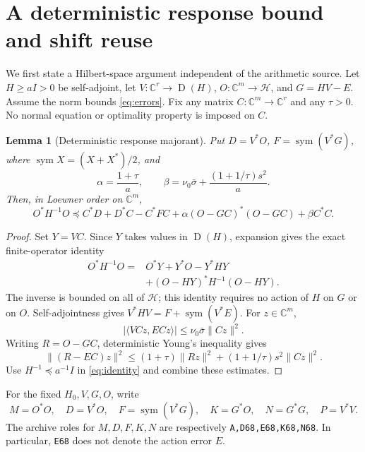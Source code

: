 \documentclass[11pt,a4paper]{article}
\newcommand{\C}{\mathbb C}
\newcommand{\HH}{\mathcal H}
\newcommand{\Id}{I}
\newcommand{\Dom}{\operatorname{D}}
\newcommand{\sym}{\operatorname{sym}}
\newcommand{\ip}[2]{\langle #1,#2\rangle}
\newcommand{\norm}[1]{\lVert #1\rVert}
\newtheorem{lemma}[theorem]{Lemma}
\theoremstyle{definition}
\theoremstyle{remark}
\numberwithin{equation}{section}
\begin{document}
\section{A deterministic response bound and shift reuse}\label{sec:reuse}

We first state a Hilbert-space argument independent of the arithmetic source.
Let \(H\ge a\Id>0\) be self-adjoint, let
\(V:\C^r\to\Dom(H)\), \(O:\C^m\to\HH\), and \(G=HV-E\).
Assume the norm bounds \eqref{eq:errors}. Fix any matrix
\(C:\C^m\to\C^r\) and any \(\tau>0\). No normal equation or optimality
property is imposed on \(C\).

\begin{lemma}[Deterministic response majorant]\label{lem:response}
Put \(D=V^*O\), \(F=\sym(V^*G)\), where
\(\sym X=(X+X^*)/2\), and
\[
 \alpha=\frac{1+\tau}{a},\qquad
 \beta=\nu_0\bar\sigma+\frac{(1+1/\tau)s^2}{a}.
\]
Then, in Loewner order on \(\C^m\),
\begin{equation}\label{eq:consumer}
 O^*H^{-1}O\preceq C^*D+D^*C-C^*FC
     +\alpha(O-GC)^*(O-GC)+\beta C^*C.
\end{equation}
\end{lemma}
\begin{proof}
Set \(Y=VC\). Since \(Y\) takes values in \(\Dom(H)\),
expansion gives the exact finite-operator identity
\begin{equation}\label{eq:identity}
 \begin{split}
 O^*H^{-1}O={}&O^*Y+Y^*O-Y^*HY\\
 &+(O-HY)^*H^{-1}(O-HY).
 \end{split}
\end{equation}
The inverse is bounded on all of \(\HH\); this identity requires no
action of \(H\) on \(G\) or on \(O\).
Self-adjointness gives
\(V^*HV=F+\sym(V^*E)\). For \(z\in\C^m\),
\[
 |\ip{VCz}{ECz}|\le\nu_0\bar\sigma\norm{Cz}^2.
\]
Writing \(R=O-GC\), deterministic Young's inequality gives
\[
 \norm{(R-EC)z}^2
 \le(1+\tau)\norm{Rz}^2+(1+1/\tau)s^2\norm{Cz}^2.
\]
Use \(H^{-1}\preceq a^{-1}\Id\) in \eqref{eq:identity} and combine
these estimates.
\end{proof}

For the fixed \(H_0,V,G,O\), write
\begin{equation}\label{eq:grams}
 M=O^*O,\quad D=V^*O,\quad F=\sym(V^*G),\quad
 K=G^*O,\quad N=G^*G,\quad P=V^*V.
\end{equation}
The archive roles for \(M,D,F,K,N\) are respectively
\texttt{A,D68,E68,K68,N68}. In particular, \texttt{E68} does not denote
the action error \(E\).
\end{document}
